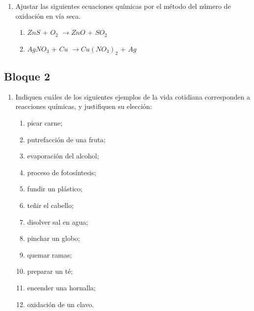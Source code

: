 \documentclass[../Práctica.root.tex]{subfiles}
\newcommand{\lra}{\ensuremath{\longrightarrow{}}}
\begin{document}
\begin{enumerate}
    \item Ajustar las siguientes ecuaciones químicas por el método del número de oxidación en vía
          seca.
          \begin{enumerate}
              \item $ZnS$ + $O_2$ \lra $ZnO$ + $SO_2$
              \item $AgNO_3$ + $Cu$ \lra $Cu(NO_3)_2$ + $Ag$
          \end{enumerate}
\end{enumerate}
\subsection{Bloque 2}
\begin{enumerate}
    \item Indiquen cuáles de los siguientes ejemplos de la vida cotidiana corresponden a reacciones
          químicas, y justifiquen su elección:
          \begin{enumerate}
              \item picar carne;
              \item putrefacción de una fruta;
              \item evaporación del alcohol;
              \item proceso de fotosíntesis;
              \item fundir un plástico;
              \item teñir el cabello;
              \item disolver sal en agua;
              \item pinchar un globo;
              \item quemar ramas;
              \item preparar un té;
              \item encender una hornalla;
              \item oxidación de un clavo.
          \end{enumerate}


\end{enumerate}
\end{document}
